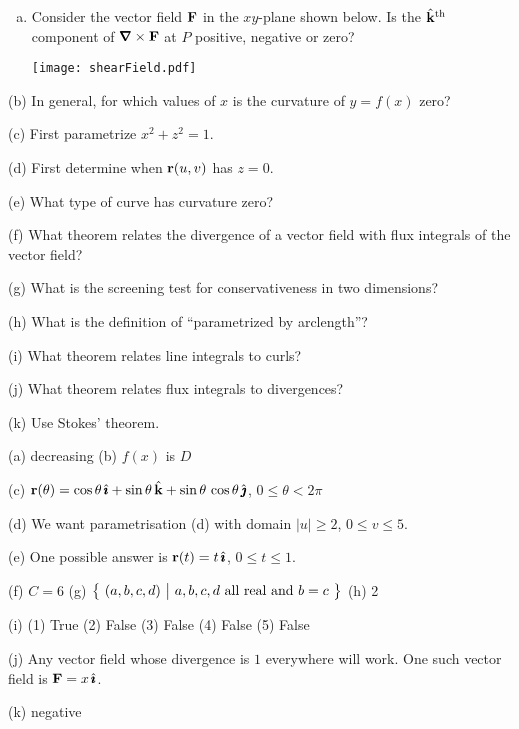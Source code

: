 \begin{question}[M317 2010D]
\begin{enumerate}[(a)]
\item 
Consider the vector field $\mathbf{F}$ in the $xy$-plane shown below.
Is the $\hat{\mathbf{k}}^{\rm th}$ component of $\vnabla\times\vF$ at $P$ 
positive, negative or zero?

  \begin{center}
       \texttt{[image: shearField.pdf]}
  \end{center}





\end{enumerate}
\end{question}

\begin{hint} 
(b) In general, for which values of $x$ is the curvature of $y=f(x)$ zero?

(c) First parametrize $x^2+z^2=1$.

(d) First determine when $\mathbf{r}(u,v)$ has $z=0$. 

(e) What type of curve has curvature zero?

(f) What theorem relates the divergence of a vector field with flux
integrals of the vector field? 

(g) What is the screening test for conservativeness in two dimensions?

(h) What is the definition of ``parametrized by arclength''?

(i) What theorem relates line integrals to curls?

(j) What theorem relates flux integrals to divergences?

(k) Use Stokes' theorem.


\end{hint}

\begin{answer} 
(a) decreasing\qquad
(b) $f(x)$ is $D$

(c) $\mathbf{r}(\theta) = \cos\theta\,\hat{\pmb{\imath}} +\sin\theta\,\hat{\mathbf{k}} 
         + \sin\theta\,\cos\theta\,\hat{\pmb{\jmath}}$,  $0\le\theta<2\pi$

(d) We want parametrisation (d) with domain $|u|\ge 2$, $0\le v\le 5$.

(e) One possible answer is $\mathbf{r}(t) = t\,\hat{\pmb{\imath}}$, $0\le t\le 1$.

(f) $C=6$\qquad
(g) $\big\{ \ (a,b,c,d)\ \big|\ a,b,c,d\text{ all real and }b=c\ \big\}$\qquad
(h) 2

(i) (1) True \quad
    (2) False \quad
    (3) False \quad
    (4) False \quad
    (5) False

(j) Any vector field whose divergence is $1$ everywhere will work.
One such vector field is $\mathbf{F}=x\,\hat{\pmb{\imath}}$.

(k) negative

\end{answer}




